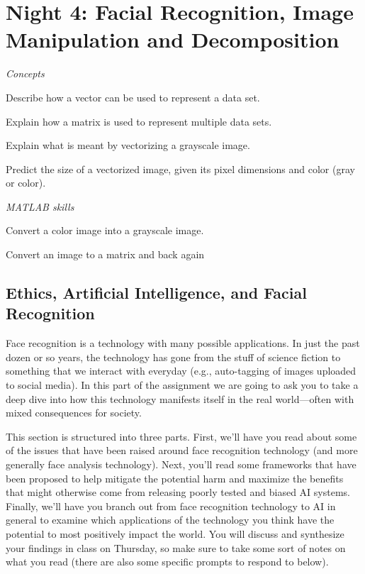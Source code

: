 \chapter{Night 4: Facial Recognition, Image Manipulation and Decomposition}

\begin{learningobjectives}
\emph{Concepts}
\bi
\item Describe how a vector can be used to represent a data set.
\item Explain how a matrix is used to represent multiple data sets.
\item Explain what is meant by vectorizing a grayscale image.
\item Predict the size of a vectorized image, given its pixel dimensions and color (gray or color). 

\ei
\emph{MATLAB skills}
\bi
\item Convert a color image into a grayscale image.
\item Convert an image to a matrix and back again
\ei
\end{learningobjectives}

\section{Ethics, Artificial Intelligence, and Facial Recognition}

Face recognition is a technology with many possible applications.  In just the past dozen or so years, the technology has gone from the stuff of science fiction to something that we interact with everyday (e.g., auto-tagging of images uploaded to social media).  In this part of the assignment we are going to ask you to take a deep dive into how this technology manifests itself in the real world---often with mixed consequences for society.

This section is structured into three parts.  First, we'll have you read about some of the issues that have been raised around face recognition technology (and more generally face analysis technology).  Next, you'll read some frameworks that have been proposed to help mitigate the potential harm and maximize the benefits that might otherwise come from releasing poorly tested and biased AI systems.  Finally, we'll have you branch out from face recognition technology to AI in general to examine which applications of the technology you think have the potential to most positively impact the world.  You will discuss and synthesize your findings in class on Thursday, so make sure to take some sort of notes on what you read (there are also some specific prompts to respond to below).

